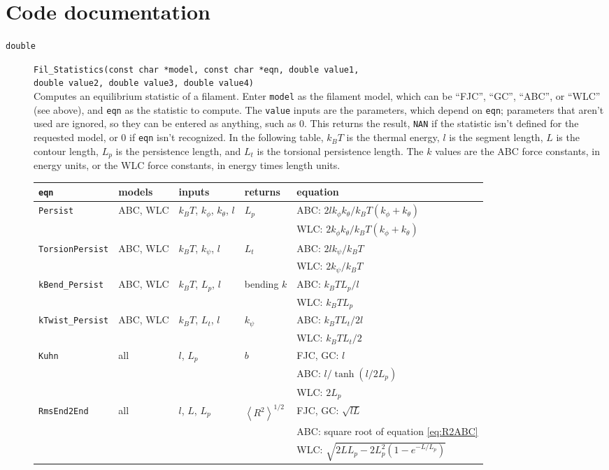 \documentclass[11pt]{article}
\newcommand {\ttt} {\texttt}
\begin{document}
\section{Code documentation}

\begin{description}

\item[\ttt{double}]
\ttt{Fil\_Statistics(const char *model, const char *eqn, double value1,}\\ \ttt{double value2, double value3, double value4)}
\hfill \\
Computes an equilibrium statistic of a filament. Enter \ttt{model} as the filament model, which can be ``FJC'', ``GC'', ``ABC'', or ``WLC'' (see above), and \ttt{eqn} as the statistic to compute. The \ttt{value} inputs are the parameters, which depend on \ttt{eqn}; parameters that aren't used are ignored, so they can be entered as anything, such as 0. This returns the result, \ttt{NAN} if the statistic isn't defined for the requested model, or 0 if \ttt{eqn} isn't recognized. In the following table, $k_BT$ is the thermal energy, $l$ is the segment length, $L$ is the contour length, $L_p$ is the persistence length, and $L_t$ is the torsional persistence length. The $k$ values are the ABC force constants, in energy units, or the WLC force constants, in energy times length units.

\setlength{\tabcolsep}{5pt}
\begin{longtable}[c]{lllll}
\ttt{eqn} & models & inputs & returns & equation \\
\hline
\ttt{Persist} & ABC, WLC & $k_BT$, $k_\phi$, $k_\theta$, $l$ & $L_p$ & ABC: $2lk_\phi k_\theta/k_BT(k_\phi+k_\theta)$ \\
 & & & & WLC: $2k_\phi k_\theta/k_BT(k_\phi+k_\theta)$ \\
\ttt{TorsionPersist} & ABC, WLC & $k_BT$, $k_\psi$, $l$ & $L_t$ & ABC: $2lk_\psi/k_BT$ \\
 & & & & WLC: $2k_\psi/k_BT$ \\
\ttt{kBend\_Persist} & ABC, WLC & $k_BT$, $L_p$, $l$ & bending $k$ & ABC: $k_BT L_p/l$ \\
 & & & & WLC: $k_BT L_p$ \\
\ttt{kTwist\_Persist} & ABC, WLC & $k_BT$, $L_t$, $l$ & $k_\psi$ & ABC: $k_BT L_t/2l$ \\
 & & & & WLC: $k_BT L_t/2$ \\
\ttt{Kuhn} & all & $l$, $L_p$ & $b$ & FJC, GC: $l$ \\
 & & & & ABC: $l/\tanh(l/2L_p)$ \\
 & & & & WLC: $2L_p$ \\
\ttt{RmsEnd2End} & all & $l$, $L$, $L_p$ & $\left<R^2\right>^{1/2}$ & FJC, GC: $\sqrt{lL}$ \\
 & & & & ABC: square root of equation \ref{eq:R2ABC} \\
 & & & & WLC: $\sqrt{2LL_p - 2L_p^2(1-e^{-L/L_p})}$
\end{longtable}


\end{description}
\end{document}
